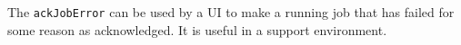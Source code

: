 The \verb+ackJobError+ can be used by a UI to make a running job that has failed for some reason as acknowledged. It is
useful in a support environment.
